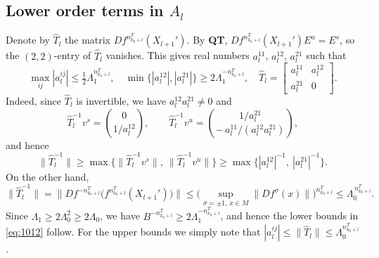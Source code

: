 \documentclass{amsart}
\theoremstyle{plain}
\theoremstyle{definition}
\theoremstyle{remark}
\numberwithin{equation}{section}
\begin{document}

\subsection{Lower order terms in $A_l$}

Denote by $\hat T_l$ the matrix $Df^{n_{k_0+l}^T}(X_{l+1}')$.
By {\bf QT}, $Df^{n_{k_0+l}^T}(X_{l+1}')E^u= E^s$,
so the $(2,2)$-entry of $\hat T_l$ vanishes.
This gives real numbers
$a_l^{11}$, $a_l^{12}$, $a_l^{21}$ such that
\begin{equation}\label{eq:1012}
    \max_{ij}|a_l^{ij}|\le\tfrac{1}{2}\Lambda_1^{n_{k_0+l}^T},\quad
    \min\{|a_l^{12}|,|a_l^{21}|\}\ge 2\Lambda_1^{-n_{k_0+l}^T},\quad
    \hat T_l=\begin{bmatrix}a_l^{11}&a_l^{12}\\a_l^{21}&0\end{bmatrix}.
\end{equation}
Indeed, since $\widehat T_l$ is invertible,
we have $a_l^{12}a_l^{21}\neq 0$ and
\[
\widehat T_l^{-1}v^s=\binom{0}{1/a_l^{12}},
\qquad
\widehat T_l^{-1}v^u=\binom{1/a_l^{21}}{-\,a_l^{11}/(a_l^{12}a_l^{21})},
\]
and hence
\[
\|\widehat T_l^{-1}\|
\ge\max\bigl\{\|\widehat T_l^{-1}v^s\|,\ \|\widehat T_l^{-1}v^u\|\bigr\}
\ge\max\bigl\{|a_l^{12}|^{-1},\ |a_l^{21}|^{-1}\bigr\}.
\]
On the other hand,
\[
\|\widehat T_l^{-1}\|
=\bigl\|Df^{-n_{k_0+l}^T}\bigl(f^{n_{k_0+l}^T}(X_{l+1}')\bigr)\bigr\|
\le \Big(\sup_{\sigma=\pm1,\,x\in M}\|Df^\sigma(x)\|\Big)^{n_{k_0+l}^T}
\le \Lambda_0^{\,n_{k_0+l}^T}.
\]
Since $\Lambda_1\ge 2\Lambda_0^2\ge 2\Lambda_0$, we have $B^{-n_{k_0+l}^T}\ge 2\Lambda_1^{-n_{k_0+l}^T}$, and hence the lower bounds in \eqref{eq:1012} follow.
For the upper bounds we simply note that
$|a_l^{ij}| \le \|\widehat T_l\|\le \Lambda_0^{n_{k_0+l}^T}$.
\end{document}
